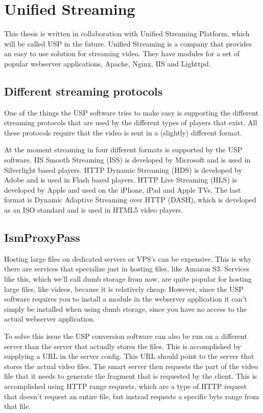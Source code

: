 \documentclass[twoside,openright]{uva-bachelor-thesis}
\begin{document}
\section{Unified Streaming}
This thesis is written in collaboration with Unified Streaming Platform, which
will be called USP in the future. Unified Streaming is a company that provides an easy to use
solution for streaming video. They have modules for a set of popular
webserver applications, Apache, Nginx, IIS and Lighttpd.


\subsection{Different streaming protocols}
One of the things the USP software tries to make easy is supporting the
different streaming protocols that are used by the different types of players
that exist. All these protocols require that the video is sent in a (slightly)
different format.

At the moment streaming in four different formats is supported by the USP
software. IIS Smooth Streaming (ISS) \autocite{smooth} is developed by
Microsoft and is used in Silverlight based players. HTTP Dynamic Streaming (HDS)
\autocite{hds} is developed by Adobe and is used in Flash based players. HTTP Live
Streaming (HLS) \autocite{hls} is developed by Apple and used on the iPhone, iPad
and Apple TVs. The last format is Dynamic Adaptive Streaming over HTTP (DASH),
which is developed as an ISO standard and is used in HTML5 video players.


\subsection{IsmProxyPass}
Hosting large files on dedicated servers or VPS's can be expensive. This is why
there are services that specialize just in hosting files, like Amazon S3.
Services like this, which we'll call dumb storage from now, are quite popular
for hosting large files, like videos, because it is relatively cheap. However,
since the USP software requires you to install a module in the webserver
application it can't simply be installed when using dumb storage, since you have
no access to the actual webserver application.

To solve this issue the USP conversion software can also be run on a different
server than the server that actually stores the files. This is accomplished by
supplying a URL in the server config. This URL should point to the server that
stores the actual video files. The smart server then requests the part of the
video file that it needs to generate the fragment that is requested by the
client. This is accomplished using HTTP range requests\autocite{rangerequests},
which are a type of HTTP request that doesn't request an entire file, but
instead requests a specific byte range from that file.
\end{document}
